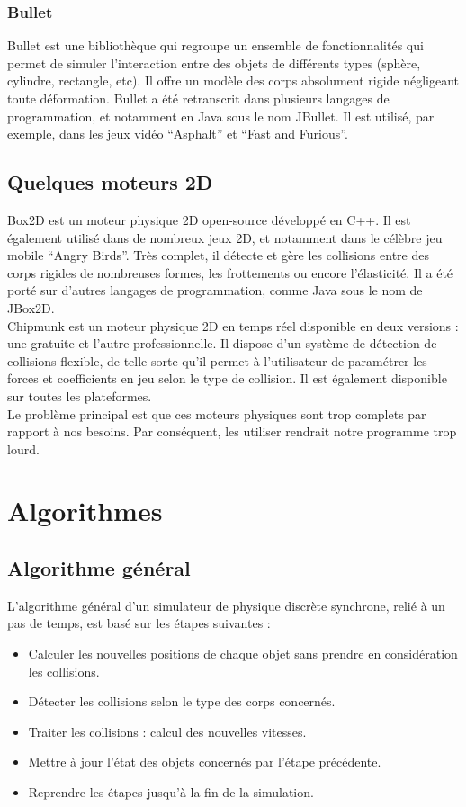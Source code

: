 \documentclass{report}
\begin{document}
\subsubsection{Bullet}

Bullet est une bibliothèque qui regroupe un ensemble de fonctionnalités qui permet de simuler l'interaction entre des objets de différents types (sphère, cylindre,  rectangle, etc). Il offre un modèle des corps absolument rigide négligeant toute déformation. Bullet a été retranscrit dans plusieurs langages de programmation, et notamment en Java sous le nom JBullet. Il est utilisé, par exemple, dans les jeux vidéo “Asphalt” et “Fast and Furious”.

\subsection{Quelques moteurs 2D}

Box2D est un moteur physique 2D open-source développé en C++. Il est également utilisé dans de nombreux jeux 2D, et notamment dans le célèbre jeu mobile “Angry Birds”. Très complet, il détecte et gère les collisions entre des corps rigides de nombreuses formes, les frottements ou encore l’élasticité. Il a été porté sur d’autres langages de programmation, comme Java sous le nom de JBox2D. \\

Chipmunk est un moteur physique 2D en temps réel disponible en deux versions : une gratuite et l’autre professionnelle. Il dispose d’un système de détection de collisions flexible, de telle sorte qu’il permet à l'utilisateur de paramétrer les forces et coefficients en jeu selon le type de collision. Il est également disponible sur toutes les plateformes. \\

Le problème principal est que ces moteurs physiques sont trop complets par rapport à nos besoins. Par conséquent, les utiliser rendrait notre programme trop lourd.

\section{Algorithmes}

\subsection{Algorithme général}

L'algorithme général d’un simulateur de physique discrète synchrone, relié à un pas de temps, est basé sur les étapes suivantes :
\begin{itemize}
\item Calculer les nouvelles positions de chaque objet sans prendre en considération les collisions.
\item Détecter les collisions selon le type des corps concernés.
\item Traiter les collisions : calcul des nouvelles vitesses.
\item Mettre à jour l’état des objets concernés par l’étape précédente.
\item Reprendre les étapes jusqu’à la fin de la simulation.
\end{itemize}
\end{document}
